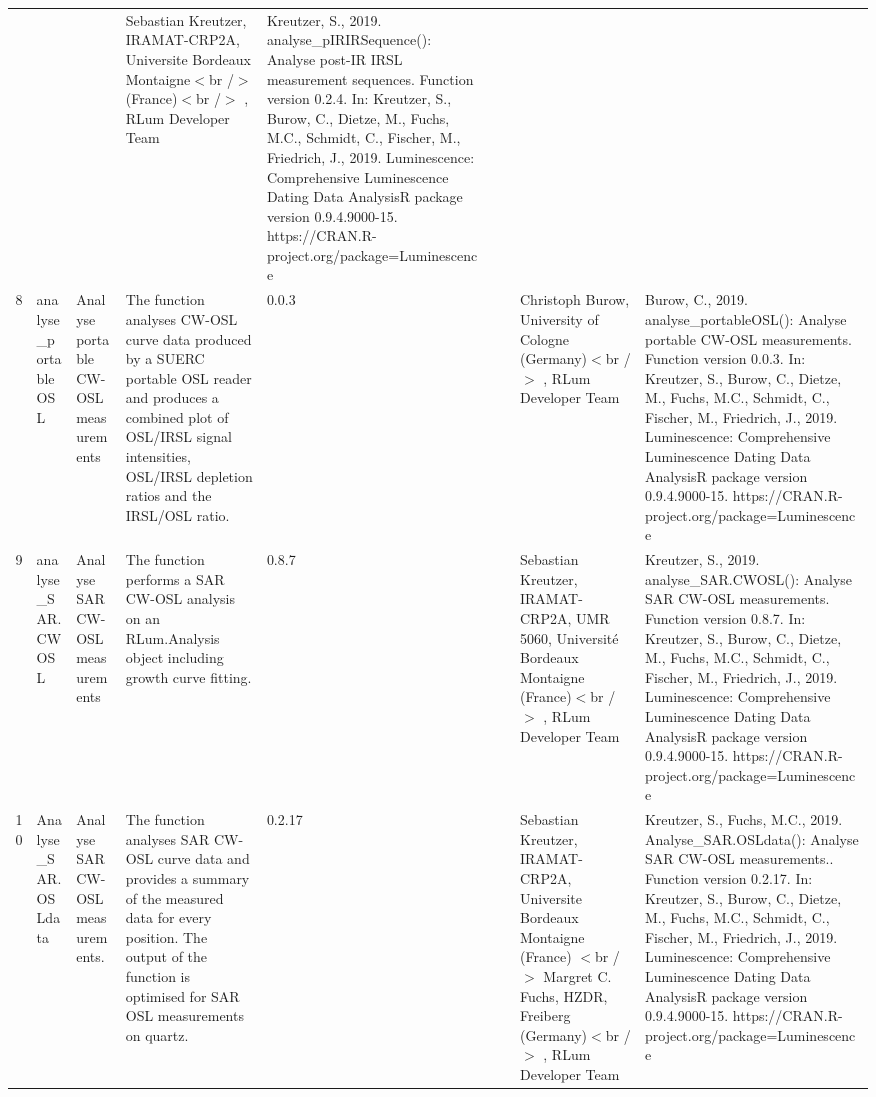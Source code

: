 \begin{table}[ht]
\begin{tabular}{rllllllll}
 &  &  & Sebastian Kreutzer, IRAMAT-CRP2A, Universite Bordeaux Montaigne$<$br /$>$ (France)$<$br /$>$ , RLum Developer Team & Kreutzer, S., 2019. analyse\_pIRIRSequence(): Analyse post-IR IRSL measurement sequences. Function version 0.2.4. In: Kreutzer, S., Burow, C., Dietze, M., Fuchs, M.C., Schmidt, C., Fischer, M., Friedrich, J., 2019. Luminescence: Comprehensive Luminescence Dating Data AnalysisR package version 0.9.4.9000-15. https://CRAN.R-project.org/package=Luminescence
 \\ 
  8 & analyse\_portableOSL & Analyse portable CW-OSL measurements & The function analyses CW-OSL curve data produced by a SUERC portable OSL reader and produces a combined plot of OSL/IRSL signal intensities, OSL/IRSL depletion ratios and the IRSL/OSL ratio. & 0.0.3
 &  &  & Christoph Burow, University of Cologne (Germany)$<$br /$>$ , RLum Developer Team & Burow, C., 2019. analyse\_portableOSL(): Analyse portable CW-OSL measurements. Function version 0.0.3. In: Kreutzer, S., Burow, C., Dietze, M., Fuchs, M.C., Schmidt, C., Fischer, M., Friedrich, J., 2019. Luminescence: Comprehensive Luminescence Dating Data AnalysisR package version 0.9.4.9000-15. https://CRAN.R-project.org/package=Luminescence
 \\ 
  9 & analyse\_SAR.CWOSL & Analyse SAR CW-OSL measurements & The function performs a SAR CW-OSL analysis on an RLum.Analysis  object including growth curve fitting. & 0.8.7
 &  &  & Sebastian Kreutzer, IRAMAT-CRP2A, UMR 5060, Université Bordeaux Montaigne (France)$<$br /$>$ , RLum Developer Team & Kreutzer, S., 2019. analyse\_SAR.CWOSL(): Analyse SAR CW-OSL measurements. Function version 0.8.7. In: Kreutzer, S., Burow, C., Dietze, M., Fuchs, M.C., Schmidt, C., Fischer, M., Friedrich, J., 2019. Luminescence: Comprehensive Luminescence Dating Data AnalysisR package version 0.9.4.9000-15. https://CRAN.R-project.org/package=Luminescence
 \\ 
  10 & Analyse\_SAR.OSLdata & Analyse SAR CW-OSL measurements. & The function analyses SAR CW-OSL curve data and provides a summary of the measured data for every position. The output of the function is optimised for SAR OSL measurements on quartz. & 0.2.17
 &  &  & Sebastian Kreutzer, IRAMAT-CRP2A, Universite Bordeaux Montaigne (France) $<$br /$>$ Margret C. Fuchs, HZDR, Freiberg (Germany)$<$br /$>$ , RLum Developer Team & Kreutzer, S., Fuchs, M.C., 2019. Analyse\_SAR.OSLdata(): Analyse SAR CW-OSL measurements.. Function version 0.2.17. In: Kreutzer, S., Burow, C., Dietze, M., Fuchs, M.C., Schmidt, C., Fischer, M., Friedrich, J., 2019. Luminescence: Comprehensive Luminescence Dating Data AnalysisR package version 0.9.4.9000-15. https://CRAN.R-project.org/package=Luminescence

\end{tabular}
\end{table}
